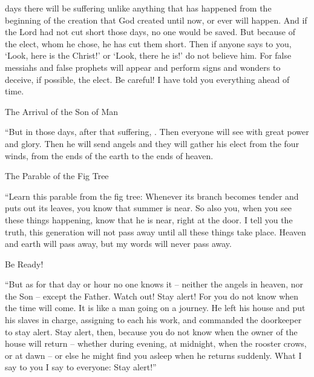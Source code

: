 {days
there will be
suffering
unlike
anything
that has happened
from
the beginning
of the creation
that
God
created
until
now,
or
ever will happen.
And
if
the Lord
had
not
cut short
those days,
no
one
would be saved.
But
because of
the elect,
whom
he chose,
he has cut
them
short.
Then
if
anyone
says
to you,
‘Look,
here
is the Christ!’ or ‘Look,
there
he is!’ do
not
believe him.
For
false messiahs
and
false prophets
will appear
and
perform
signs
and
wonders
to
deceive,
if
possible,
the elect.
Be careful! I have told
you
everything
ahead of time.
\par }{\SH The Arrival of the Son of Man
\par }{\PP {}“But
in
those
days,
after
that
suffering,
{}
.
Then
everyone will see
{}
with
great
power
and
glory.
Then
he will send
angels
and
they will gather
his
elect
from
the four
winds,
from
the ends
of the earth
to
the ends
of heaven.
\par }{\SH The Parable of the Fig Tree
\par }{\PP {}“Learn
this parable
from
the fig tree: Whenever
its
branch
becomes
tender
and
puts out
its leaves,
you know
that
summer
is
near.
So
also
you,
when
you see
these things
happening,
know
that
he is
near, right
at
the door.
I tell
you
the truth,
this
generation
will
not
pass away
until
all
these things
take place.
Heaven
and
earth
will pass away,
but
my
words
will
never
pass away.
\par }{\SH Be Ready!
\par }{\PP {}“But
as
for that
day
or
hour
no one
knows it – neither the angels in heaven, nor the Son – except the Father.
Watch out! Stay alert! For
you do
not
know
when
the time
will come.
It is like
a man
going on a journey.
He left
his
house
and
put
his
slaves
in charge, assigning
to each
his
work,
and
commanded
the doorkeeper
to
stay alert.
Stay alert,
then,
because
you do
not
know
when
the owner
of the house
will return
– whether during evening,
at midnight,
when the rooster crows,
or
at dawn –
or else he might find
you
asleep
when
he returns
suddenly.
What
I say
to you
I say
to everyone: Stay alert!”

}
